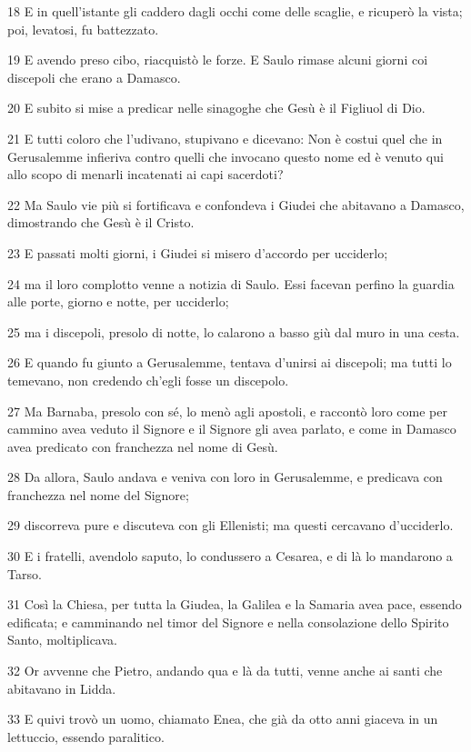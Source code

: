 \par 18 E in quell'istante gli caddero dagli occhi come delle scaglie, e ricuperò la vista; poi, levatosi, fu battezzato.
\par 19 E avendo preso cibo, riacquistò le forze. E Saulo rimase alcuni giorni coi discepoli che erano a Damasco.
\par 20 E subito si mise a predicar nelle sinagoghe che Gesù è il Figliuol di Dio.
\par 21 E tutti coloro che l'udivano, stupivano e dicevano: Non è costui quel che in Gerusalemme infieriva contro quelli che invocano questo nome ed è venuto qui allo scopo di menarli incatenati ai capi sacerdoti?
\par 22 Ma Saulo vie più si fortificava e confondeva i Giudei che abitavano a Damasco, dimostrando che Gesù è il Cristo.
\par 23 E passati molti giorni, i Giudei si misero d'accordo per ucciderlo;
\par 24 ma il loro complotto venne a notizia di Saulo. Essi facevan perfino la guardia alle porte, giorno e notte, per ucciderlo;
\par 25 ma i discepoli, presolo di notte, lo calarono a basso giù dal muro in una cesta.
\par 26 E quando fu giunto a Gerusalemme, tentava d'unirsi ai discepoli; ma tutti lo temevano, non credendo ch'egli fosse un discepolo.
\par 27 Ma Barnaba, presolo con sé, lo menò agli apostoli, e raccontò loro come per cammino avea veduto il Signore e il Signore gli avea parlato, e come in Damasco avea predicato con franchezza nel nome di Gesù.
\par 28 Da allora, Saulo andava e veniva con loro in Gerusalemme, e predicava con franchezza nel nome del Signore;
\par 29 discorreva pure e discuteva con gli Ellenisti; ma questi cercavano d'ucciderlo.
\par 30 E i fratelli, avendolo saputo, lo condussero a Cesarea, e di là lo mandarono a Tarso.
\par 31 Così la Chiesa, per tutta la Giudea, la Galilea e la Samaria avea pace, essendo edificata; e camminando nel timor del Signore e nella consolazione dello Spirito Santo, moltiplicava.
\par 32 Or avvenne che Pietro, andando qua e là da tutti, venne anche ai santi che abitavano in Lidda.
\par 33 E quivi trovò un uomo, chiamato Enea, che già da otto anni giaceva in un lettuccio, essendo paralitico.
